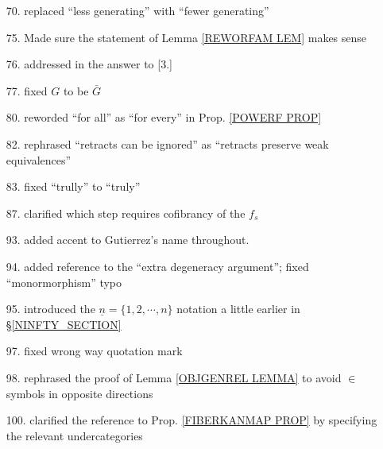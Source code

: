 \documentclass{article}
\begin{document}
\begin{itemize}
\item[70.] replaced ``less generating'' with ``fewer generating''

\item[75.] Made sure the statement of Lemma \ref{REWORFAM LEM} makes sense

\item[76.] addressed in the answer to [3.]

\item[77.] fixed $G$ to be $\bar{G}$

\item[80.] reworded ``for all'' as ``for every'' in Prop. \ref{POWERF PROP}

\item[82.] rephrased ``retracts can be ignored''
as ``retracts preserve weak equivalences''

\item[83.] fixed ``trully'' to ``truly''

\item[87.] clarified which step requires cofibrancy of the 
$f_s$

\item[93.] added accent to Gutierrez's name throughout.

\item[94.] added \cite{Ri14} reference to the ``extra degeneracy argument''; fixed ``monormorphism'' typo

\item[95.] introduced the 
$\underline{n} = \{1,2,\cdots,n\}$
notation a little earlier in \S \ref{NINFTY_SECTION}

\item[97.] fixed wrong way quotation mark

\item[98.] rephrased the proof of Lemma \ref{OBJGENREL LEMMA}
to avoid $\in$ symbols in opposite directions

\item[100.] clarified the reference to Prop. \ref{FIBERKANMAP PROP} by specifying the relevant undercategories

\end{itemize}








{}


\end{document}

